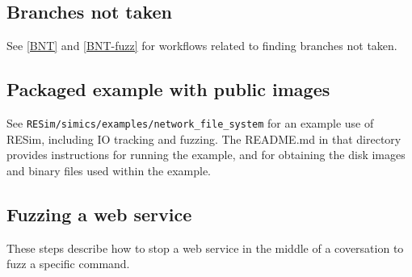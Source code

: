 \documentclass[titlepage]{article}
\begin{document}
\subsection{Branches not taken}
See \ref{BNT} and \ref{BNT-fuzz} for workflows related to finding branches not taken.

\subsection{Packaged example with public images}
See {\tt RESim/simics/examples/network\_file\_system} for an example use of RESim, including IO tracking and fuzzing.
The README.md in that directory provides instructions for running the example, and for obtaining the disk images
and binary files used within the example.

\subsection{Fuzzing a web service}
\label{web_conversation}
These steps describe how to stop a web service in the middle of
a coversation to fuzz a specific command.
\end{document}
